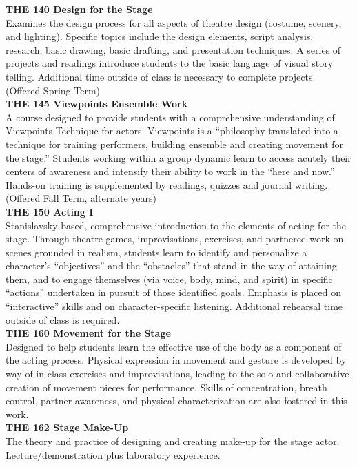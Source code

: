 \documentclass[
  letterpaper,
]{scrbook}
\begin{document}
\textbf{THE 140 Design for the Stage}\\
Examines the design process for all aspects of theatre design (costume,
scenery, and lighting). Specific topics include the design elements,
script analysis, research, basic drawing, basic drafting, and
presentation techniques. A series of projects and readings introduce
students to the basic language of visual story telling. Additional time
outside of class is necessary to complete projects. (Offered Spring
Term)\\
\textbf{THE 145 Viewpoints Ensemble Work}\\
A course designed to provide students with a comprehensive understanding
of Viewpoints Technique for actors. Viewpoints is a ``philosophy
translated into a technique for training performers, building ensemble
and creating movement for the stage.'' Students working within a group
dynamic learn to access acutely their centers of awareness and intensify
their ability to work in the ``here and now.'' Hands-on training is
supplemented by readings, quizzes and journal writing. (Offered Fall
Term, alternate years)\\
\textbf{THE 150 Acting I}\\
Stanislavsky-based, comprehensive introduction to the elements of acting
for the stage. Through theatre games, improvisations, exercises, and
partnered work on scenes grounded in realism, students learn to identify
and personalize a character's ``objectives'' and the ``obstacles'' that
stand in the way of attaining them, and to engage themselves (via voice,
body, mind, and spirit) in specific ``actions'' undertaken in pursuit of
those identified goals. Emphasis is placed on ``interactive'' skills and
on character-specific listening. Additional rehearsal time outside of
class is required.\\
\textbf{THE 160 Movement for the Stage}\\
Designed to help students learn the effective use of the body as a
component of the acting process. Physical expression in movement and
gesture is developed by way of in-class exercises and improvisations,
leading to the solo and collaborative creation of movement pieces for
performance. Skills of concentration, breath control, partner awareness,
and physical characterization are also fostered in this work.\\
\textbf{THE 162 Stage Make-Up}\\
The theory and practice of designing and creating make-up for the stage
actor. Lecture/demonstration plus laboratory experience.\\
\end{document}
